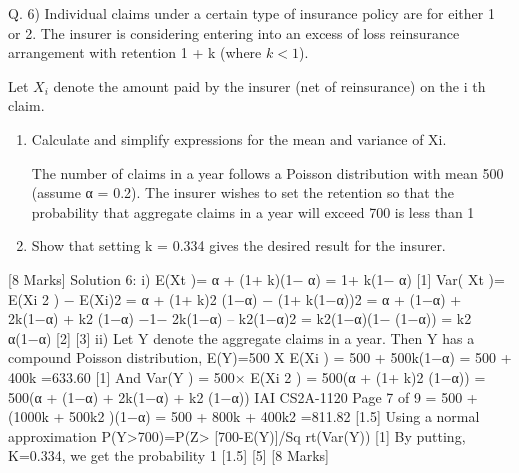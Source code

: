 \documentclass[a4paper,12pt]{article}
\begin{document}
Q. 6) Individual claims under a certain type of insurance policy are for either 1 or 2. The insurer
is considering entering into an excess of loss reinsurance arrangement with retention
1 + k (where $k < 1$). 

Let $X_i$ denote the amount paid by the insurer (net of reinsurance) on the i th claim.

\begin{enumerate}
\item  Calculate and simplify expressions for the mean and variance of Xi. 



The number of claims in a year follows a Poisson distribution with mean 500 (assume
α = 0.2). The insurer wishes to set the retention so that the probability that aggregate claims
in a year will exceed 700 is less than 1%
\item   Show that setting k = 0.334 gives the desired result for the insurer. 
\end{enumerate}


[8 Marks]
Solution 6:
i)
E(Xt )= α + (1+ k)(1− α)
= 1+ k(1− α)
[1]
Var( Xt )= E(Xi
2 ) − E(Xi)2
= α + (1+ k)2 (1−α) − (1+ k(1−α))2
= α + (1−α) + 2k(1−α) + k2 (1−α) −1− 2k(1−α) – k2(1−α)2
= k2(1−α)(1− (1−α))
= k2 α(1−α) [2]
[3]
ii)
Let Y denote the aggregate claims in a year. Then Y has a compound Poisson distribution,
E(Y)=500 X E(Xi ) = 500 + 500k(1−α) = 500 + 400k =633.60
[1]
And
Var(Y ) = 500× E(Xi
2 )
= 500(α + (1+ k)2 (1−α))
= 500(α + (1−α) + 2k(1−α) + k2 (1−α))
IAI CS2A-1120
Page 7 of 9
= 500 + (1000k + 500k2 )(1−α)
= 500 + 800k + 400k2 =811.82 [1.5]
Using a normal approximation
P(Y>700)=P(Z> [700-E(Y)]/Sq rt(Var(Y)) [1]
By putting, K=0.334, we get the probability 1%
[1.5]
[5]
[8 Marks]
\end{document}
